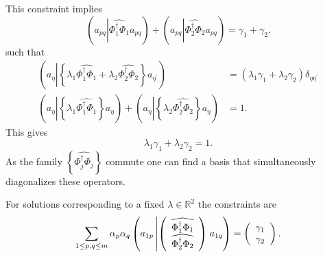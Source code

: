\documentclass[aps,preprint]{revtex4}%
\begin{document}
This constraint implies
\begin{equation}
\left(  a_{pq}\left\vert \widehat{\Phi_{1}^{\dagger}\Phi_{1}}\right.
a_{pq}\right)  +\left(  a_{pq}\left\vert \widehat{\Phi_{2}^{\dagger}\Phi_{2}%
}\right.  a_{pq}\right)  =\gamma_{1}+\gamma_{2}.
\end{equation}
such that
\begin{align}
\left(  a_{\eta}\left\vert \left\{  \lambda_{1}\widehat{\Phi_{1}^{\dagger}%
\Phi_{1}}+\lambda_{2}\widehat{\Phi_{2}^{\dagger}\Phi_{2}}\right\}
a_{\eta^{\prime}}\right.  \right)   &  =\left(  \lambda_{1}\gamma_{1}%
+\lambda_{2}\gamma_{2}\right)  \delta_{\eta\eta^{\prime}}\\
\left(  a_{\eta}\left\vert \left\{  \lambda_{1}\widehat{\Phi_{1}^{\dagger}%
\Phi_{1}}\right\}  a_{\eta}\right.  \right)  +\left(  a_{\eta}\left\vert
\left\{  \lambda_{2}\widehat{\Phi_{2}^{\dagger}\Phi_{2}}\right\}  a_{\eta
}\right.  \right)   &  =1.
\end{align}
This gives
\begin{equation}
\lambda_{1}\gamma_{1}+\lambda_{2}\gamma_{2}=1.
\end{equation}
As the family $\left\{  \widehat{\Phi_{j}^{\dagger}\Phi_{j}}\right\}  $
commute one can find a basis that simultaneously diagonalizes these operators.

For solutions corresponding to a fixed $\lambda\in\mathbb{R}^{2}$ the
constraints are
\begin{equation}
\sum_{1\leq p,q\leq m}\alpha_{p}\alpha_{q}\left(  a_{1p}\left\vert \left(
\begin{array}
[c]{c}%
\widehat{\Phi_{1}^{\dagger}\Phi_{1}}\\
\widehat{\Phi_{2}^{\dagger}\Phi_{2}}%
\end{array}
\right)  \right.  a_{1q}\right)  =\left(
\begin{array}
[c]{c}%
\gamma_{1}\\
\gamma_{2}%
\end{array}
\right)  .
\end{equation}
\end{document}
